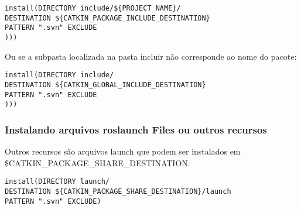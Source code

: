\begin{verbatim}
install(DIRECTORY include/${PROJECT_NAME}/
DESTINATION ${CATKIN_PACKAGE_INCLUDE_DESTINATION}
PATTERN ".svn" EXCLUDE
)))\end{verbatim}

Ou se a subpasta localizada na pasta incluir não corresponde ao nome do pacote:

\begin{verbatim}
install(DIRECTORY include/
DESTINATION ${CATKIN_GLOBAL_INCLUDE_DESTINATION}
PATTERN ".svn" EXCLUDE
)))\end{verbatim}

\subsubsection{Instalando arquivos roslaunch Files ou outros recursos}

Outros recursos são arquivos launch que podem ser instalados em \${CATKIN\_PACKAGE\_SHARE\_DESTINATION}:

\begin{verbatim}
install(DIRECTORY launch/
DESTINATION ${CATKIN_PACKAGE_SHARE_DESTINATION}/launch
PATTERN ".svn" EXCLUDE)
\end{verbatim}